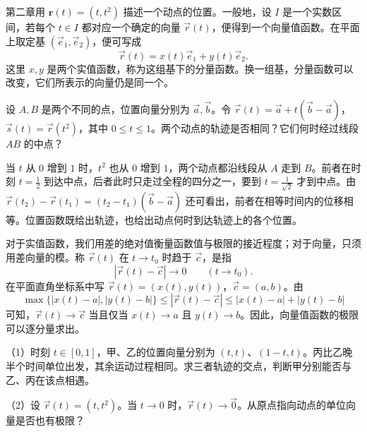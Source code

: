 第二章用 \(\mathbf r(t)=(t,t^2)\) 描述一个动点的位置。一般地，设 \(I\) 是一个实数区间，若每个 \(t\in I\) 都对应一个确定的向量 \(\vec r(t)\)，便得到一个{\heiti 向量值函数}。在平面上取定基 \((\vec e_1,\vec e_2)\)，便可写成
\[
 \vec r(t)=x(t)\vec e_1+y(t)\vec e_2.
\]
这里 \(x,y\) 是两个实值函数，称为这组基下的{\heiti 分量函数}。换一组基，分量函数可以改变，它们所表示的向量仍是同一个。

\begin{example}\label{ex:vector-position-segment}
设 \(A,B\) 是两个不同的点，位置向量分别为 \(\vec a,\vec b\)。令 \(\vec r(t)=\vec a+t(\vec b-\vec a)\)，\(\vec s(t)=\vec r(t^2)\)，其中 \(0\leq t\leq 1\)。两个动点的轨迹是否相同？它们何时经过线段 \(AB\) 的中点？
\end{example}

当 \(t\) 从 \(0\) 增到 \(1\) 时，\(t^2\) 也从 \(0\) 增到 \(1\)，两个动点都沿线段从 \(A\) 走到 \(B\)。前者在时刻 \(t=\tfrac12\) 到达中点，后者此时只走过全程的四分之一，要到 \(t=\tfrac1{\sqrt2}\) 才到中点。由 \(\vec r(t_2)-\vec r(t_1)=(t_2-t_1)(\vec b-\vec a)\) 还可看出，前者在相等时间内的位移相等。位置函数既给出轨迹，也给出动点何时到达轨迹上的各个位置。

对于实值函数，我们用差的绝对值衡量函数值与极限的接近程度；对于向量，只须用差向量的模。称 \(\vec r(t)\) 在 \(t\to t_0\) 时{\heiti 趋于} \(\vec c\)，是指
\[
 |\vec r(t)-\vec c|\longrightarrow 0\qquad(t\to t_0).
\]
在平面直角坐标系中写 \(\vec r(t)=(x(t),y(t))\)，\(\vec c=(a,b)\)。由
\[
 \max\{|x(t)-a|,|y(t)-b|\}
 \leq |\vec r(t)-\vec c|
 \leq |x(t)-a|+|y(t)-b|
\]
可知，\(\vec r(t)\to\vec c\) 当且仅当 \(x(t)\to a\) 且 \(y(t)\to b\)。因此，向量值函数的极限可以逐分量求出。

\begin{exercise}
\mbox{}\par\nobreak

（1）时刻 \(t\in[0,1]\)，甲、乙的位置向量分别为 \((t,t)\)、\((1-t,t)\)。丙比乙晚半个时间单位出发，其余运动过程相同。求三者轨迹的交点，判断甲分别能否与乙、丙在该点相遇。

（2）设 \(\vec r(t)=(t,t^2)\)。当 \(t\to0\) 时，\(\vec r(t)\to\vec0\)。从原点指向动点的单位向量是否也有极限？
\end{exercise}

\newpage
